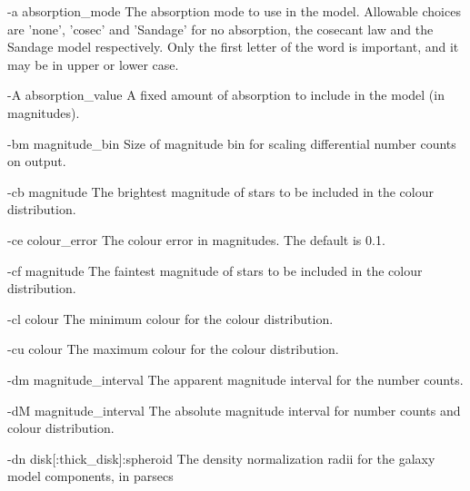 \begin{clo}{-a absorption\_mode}
The absorption mode to use in the model. Allowable choices are 'none', 'cosec'
and 'Sandage' for no absorption, the cosecant law and the Sandage model
respectively. Only the first letter of the word is important, and it may 
be in upper or lower case.
\end{clo}

\begin{clo}{-A absorption\_value}
A fixed amount of absorption to include in the model (in magnitudes).
\end{clo}

\begin{clo}{-bm magnitude\_bin}
Size of magnitude bin for scaling differential number counts on output.
\end{clo}

\begin{clo}{-cb magnitude}
The brightest magnitude of stars to be included in the colour distribution.
\end{clo}

\begin{clo}{-ce colour\_error}
The colour error in magnitudes. The default is 0.1.
\end{clo}

\begin{clo}{-cf magnitude}
The faintest magnitude of stars to be included in the colour distribution.
\end{clo}

\begin{clo}{-cl colour}
The minimum colour for the colour distribution.
\end{clo}

\begin{clo}{-cu colour}
The maximum colour for the colour distribution.
\end{clo}

\begin{clo}{-dm magnitude\_interval}
The apparent magnitude interval for the number counts.
\end{clo}

\begin{clo}{-dM magnitude\_interval}
The absolute magnitude interval for number counts and colour distribution.
\end{clo}

\begin{clo}{-dn disk[:thick\_disk]:spheroid}
The density normalization radii for the galaxy model components, in parsecs
\end{clo}

